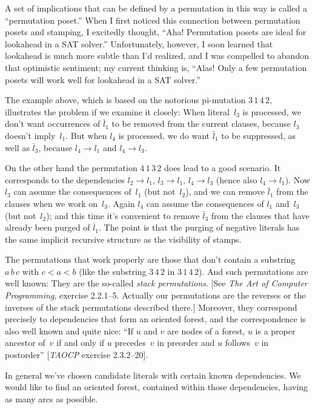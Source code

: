 A set of implications that can be defined by a permutation in this way is
called a ``permutation poset.'' When I first noticed this connection between
permutation posets and stamping, I excitedly thought, ``Aha! Permutation
posets are ideal for lookahead in a {\mc SAT} solver.'' Unfortunately,
however, I soon learned that lookahead is much more subtle than I'd
realized, and I was compelled to abandon that optimistic sentiment;
my current thinking is, ``Alas! Only a few permutation posets will work
well for lookahead in a {\mc SAT} solver.''

The example above, which is based on the notorious pi-mutation $3\,1\,4\,2$,
illustrates the problem if we examine it closely: When literal~$l_3$ is
processed, we don't want occurrences of $\bar l_1$ to be removed from the
current clauses, because $l_3$ doesn't imply~$l_1$. But when $l_4$ is
processed, we do want $\bar l_1$ to be suppressed, as well as $\bar l_3$,
because $l_4\to l_1$ and $l_4\to l_3$.

On the other hand the permutation $4\,1\,3\,2$ does lead to a good scenario.
It corresponds to the dependencies $l_2\to l_1$, $l_3\to l_1$, $l_4\to l_3$
(hence also $l_4\to l_1$). Now $l_3$ can assume the consequences of~$l_1$
(but not~$l_2$), and we can remove $\bar l_1$ from the clauses when we work
on~$l_3$. Again $l_4$ can assume the consequences of $l_1$ and~$l_3$ (but
not~$l_2$); and this time it's convenient to remove $\bar l_3$ from the
clauses that have already been purged of $\bar l_1$. The point is that
the purging of negative literals has the same implicit recursive structure
as the visibility of stamps.

The permutations that work properly are those that don't contain a
substring $a\,b\,c$ with $c<a<b$ (like the substring $3\,4\,2$ in
$3\,1\,4\,2$). And such permutations are well known: They are the so-called
{\it stack permutations\/}. [See {\sl The Art of Computer Programming},
exercise 2.2.1--5. Actually our permutations are the reverses or the
inverses of the stack permutations described there.] Moreover, they correspond
precisely to dependencies that form an oriented forest, and the correspondence
is also well known and quite nice: ``If $u$ and $v$ are nodes of a forest,
$u$ is a proper ancestor of~$v$ if and only if $u$ precedes~$v$ in
preorder and $u$ follows~$v$ in postorder'' [{\sl TAOCP\/} exercise
2.3.2--20].

In general we've chosen candidate literals with certain known dependencies.
We would like to find an oriented forest, contained within those
dependencies, having as many arcs as possible.


